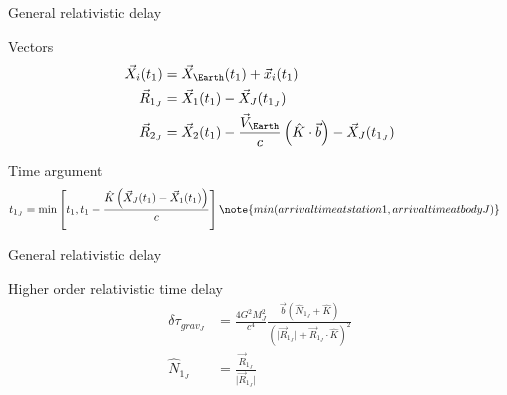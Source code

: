 \documentclass[14pt,table,t, c]{beamer}
\begin{document}
\begin{frame}{General relativistic delay}
\begin{block}{Vectors}
\vspace*{-\baselineskip}\setlength\belowdisplayskip{0pt}\setlength\abovedisplayskip{0pt}
\begin{align*}
\vec{X}_i(t_1) &= \vec{X}_{\Earth}(t_1) + \vec{x}_i(t_1) \\
\vec{R}_{1_J} &= \vec{X}_1(t_1) - \vec{X}_J(t_{1_J}) \\
\vec{R}_{2_J} &= \vec{X}_2(t_1) - \frac{\vec{V}_{\Earth}}{c}\left(\hat{K}\cdot\vec{b}\right) - \vec{X}_J(t_{1_J})
\end{align*}
\end{block}
\begin{block}{Time argument}
\vspace*{-\baselineskip}\setlength\belowdisplayskip{0pt}\setlength\abovedisplayskip{0pt}
\begin{align*}
t_{1_J} &= \min\left[t_1,t_1 -\frac{\hat{K}\left(\vec{X}_J(t_1) - \vec{X}_1(t_1)\right)}{c} \right]
\note {min(arrival time at station 1, arrival time at body J)}
\end{align*}
\end{block}
\end{frame}



\begin{frame}{General relativistic delay}
\begin{block}{Higher order relativistic time delay}
\vspace*{-\baselineskip}\setlength\belowdisplayskip{0pt}\setlength\abovedisplayskip{0pt}
\begin{align*}
\delta\tau_{grav_J} &= \frac{4G^2M_J^2}{c^4}\frac{\vec{b}\left(\hat{N}_{1_J} +
\hat{K}\right)}{\left(\lvert\vec{R}_{1_J}\rvert + \vec{R}_{1_J}\cdot\hat{K}\right)^2} \\
\hat{N}_{1_J} &= \frac{\vec{R}_{1_J}}{\lvert\vec{R}_{1_J}\rvert}
\end{align*}
\end{block}
\end{frame}

\end{document}
